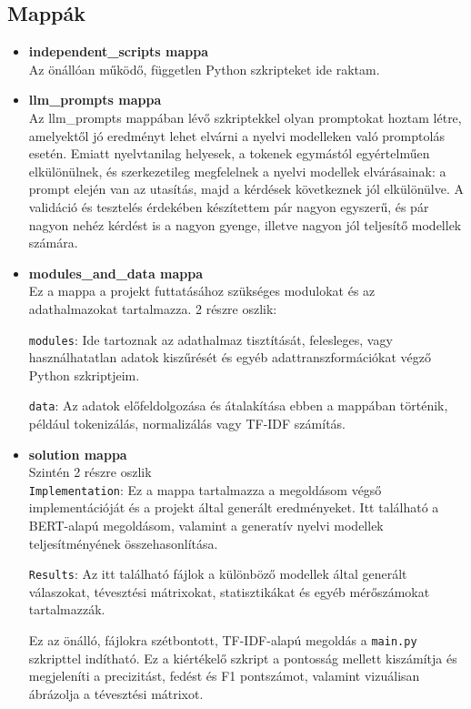 \documentclass[12pt]{report}
\theoremstyle{definition}
\begin{document}
\subsection*{ Mappák}
\begin{itemize}
	\item \textbf{independent\_scripts mappa}\\
            Az önállóan működő, független Python szkripteket ide raktam.
	\item \textbf{llm\_prompts mappa}\\
	      Az llm\_prompts mappában lévő szkriptekkel olyan promptokat hoztam létre, amelyektől jó eredményt lehet elvárni a nyelvi modelleken való promptolás esetén. Emiatt nyelvtanilag helyesek, a tokenek egymástól egyértelműen elkülönülnek, és szerkezetileg megfelelnek a nyelvi modellek elvárásainak: a prompt elején van az utasítás, majd a kérdések következnek jól elkülönülve.
	      A validáció és tesztelés érdekében készítettem pár nagyon egyszerű, és pár nagyon nehéz kérdést is a nagyon gyenge, illetve nagyon jól teljesítő modellek számára.

	\item
	      \textbf{modules\_and\_data mappa}\\
	      Ez a mappa a projekt futtatásához szükséges modulokat és az adathalmazokat tartalmazza.
	      2 részre oszlik:

	      \texttt{modules}: Ide tartoznak az adathalmaz tisztítását, felesleges, vagy használhatatlan adatok kiszűrését és egyéb adattranszformációkat végző Python szkriptjeim.

	      \texttt{data}: Az adatok előfeldolgozása és átalakítása ebben a mappában történik, például tokenizálás, normalizálás vagy TF-IDF számítás.

	\item
	      \textbf{solution mappa}\\
	      Szintén 2 részre oszlik\\
	      \texttt{Implementation}: Ez a mappa tartalmazza a megoldásom végső implementációját és a projekt által generált eredményeket. Itt található a BERT-alapú megoldásom, valamint a generatív nyelvi modellek teljesítményének összehasonlítása.

	      \texttt{Results}: Az itt található fájlok a különböző modellek által generált válaszokat, tévesztési mátrixokat, statisztikákat és egyéb mérőszámokat tartalmazzák.

          Ez az önálló, fájlokra szétbontott, TF-IDF-alapú megoldás a \texttt{main.py} szkripttel indítható. Ez a kiértékelő szkript a pontosság mellett kiszámítja és megjeleníti a precizitást, fedést és F1 pontszámot, valamint vizuálisan ábrázolja a tévesztési mátrixot.


\end{itemize}
\end{document}
